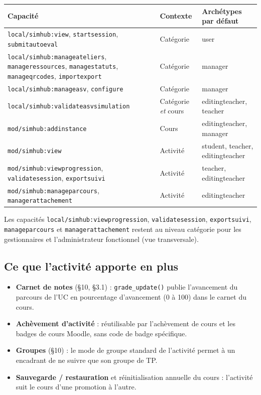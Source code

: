 \documentclass[11pt,a4paper]{article}
\newcommand{\code}[1]{\texttt{\small #1}}
\begin{document}
\begin{center}
\begin{tabularx}{\textwidth}{>{\raggedright}p{6.4cm}>{\raggedright}p{2.6cm}X}
\toprule
\textbf{Capacité} & \textbf{Contexte} & \textbf{Archétypes par défaut} \\
\midrule
\code{local/simhub:view}, \code{startsession}, \code{submitautoeval} & Catégorie & user \\
\code{local/simhub:manageateliers}, \code{manageressources}, \code{managestatuts},
\code{manageqrcodes}, \code{importexport} & Catégorie & manager \\
\code{local/simhub:manageasv}, \code{configure} & Catégorie & manager \\
\code{local/simhub:validateasvsimulation} & Catégorie \emph{et} cours & editingteacher,
teacher \\
\addlinespace
\code{mod/simhub:addinstance} & Cours & editingteacher, manager \\
\code{mod/simhub:view} & Activité & student, teacher, editingteacher \\
\code{mod/simhub:viewprogression}, \code{validatesession}, \code{exportsuivi} & Activité &
teacher, editingteacher \\
\code{mod/simhub:manageparcours}, \code{managerattachement} & Activité & editingteacher \\
\bottomrule
\end{tabularx}
\end{center}

Les capacités \code{local/simhub:viewprogression}, \code{validatesession},
\code{exportsuivi}, \code{manageparcours} et \code{managerattachement} restent au niveau
catégorie pour les gestionnaires et l'administrateur fonctionnel (vue transversale).

\subsection{Ce que l'activité apporte en plus}
\begin{itemize}
  \item \textbf{Carnet de notes} (§10, §3.1) : \code{grade\_update()} publie l'avancement du
  parcours de l'UC en pourcentage d'avancement (0 à 100) dans le carnet du cours.
  \item \textbf{Achèvement d'activité} : réutilisable par l'achèvement de cours et les badges
  de cours Moodle, sans code de badge spécifique.
  \item \textbf{Groupes} (§10) : le mode de groupe standard de l'activité permet à un
  encadrant de ne suivre que son groupe de TP.
  \item \textbf{Sauvegarde / restauration} et réinitialisation annuelle du cours :
  l'activité suit le cours d'une promotion à l'autre.
\end{itemize}
\end{document}
